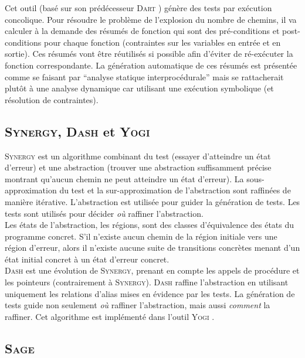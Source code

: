 Cet outil \cite{SMART} (basé sur son prédécesseur \textsc{Dart} \cite{DART})
génère des tests par exécution concolique. Pour résoudre le problème de
l'explosion du nombre de chemins, il va calculer à la demande des résumés de
fonction qui sont des pré-conditions et post-conditions pour chaque fonction
(contraintes sur les variables en entrée et en sortie). Ces résumés vont être
réutilisés si possible afin d'éviter de ré-exécuter la fonction correspondante.
La génération automatique de ces résumés est présentée comme se faisant par
``analyse statique interprocédurale'' mais se rattacherait plutôt à une analyse
dynamique car utilisant une exécution symbolique (et résolution de contraintes).

\subsection{\textsc{Synergy}, \textsc{Dash} et \textsc{Yogi}}

\textsc{Synergy} \cite{SYNERGY} est un algorithme combinant du test (essayer
d'atteindre un état d'erreur) et une abstraction (trouver une abstraction
suffisamment précise montrant qu'aucun chemin ne peut atteindre un état
d'erreur). La sous-approximation du test et la sur-approximation de
l'abstraction sont raffinées de manière itérative. L'abstraction est utilisée
pour guider la génération de tests. Les tests sont utilisés pour décider
{\em où} raffiner l'abstraction.\\

Les états de l'abstraction, les régions, sont des classes d'équivalence des
états du programme concret. S'il n'existe aucun chemin de la région initiale
vers une région d'erreur, alors il n'existe aucune suite de transitions
concrètes menant d'un état initial concret à un état d'erreur concret.\\

\textsc{Dash} \cite{DASH} est une évolution de \textsc{Synergy}, prenant en
compte les appels de procédure et les pointeurs (contrairement à
\textsc{Synergy}). \textsc{Dash} raffine l'abstraction en utilisant uniquement
les relations d'alias mises en évidence par les tests. La génération de tests
guide non seulement {\em où} raffiner l'abstraction, mais aussi {\em comment}
la raffiner. Cet algorithme est implémenté dans l'outil \textsc{Yogi}
\cite{YOGI}.

\subsection{\textsc{Sage}}

